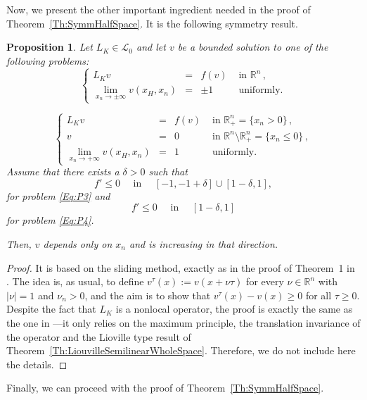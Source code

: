 \documentclass[12pt,reqno]{amsart}
\makeatletter
\newtheorem{proposition}[theorem]{Proposition}
\theoremstyle{definition}
\theoremstyle{remark}
\newcommand{\con}[1]{\mathbb{#1}}
\newcommand{\R}{\con{R}} %
\newcommand{\lcal}{\mathcal{L}}
\newcommand{\reqnomode}{\tagsleft@false\let\veqno\@@eqno}
\newcommand\beqc[1]{\left\{\begin{array}{#1}}
\newcommand\eeqc{\end{array} \right.}
\def\PDEsystem{rcll}
\def\ds{\displaystyle}
\numberwithin{equation}{section}
\makeatother
\begin{document}
Now, we present the other important ingredient needed in the proof of Theorem~\ref{Th:SymmHalfSpace}. It is the following symmetry result.

\begin{proposition}
	\label{Prop:HalfSpaceLimUnif}
	Let $L_K \in \lcal_0$ and let $v$ be a bounded solution to one of the following problems:
	\begin{equation}
	\tag{P3}
	\label{Eq:P3}
	\beqc{\PDEsystem}
	L_K  v &=& f(v)  &\textrm{ in }\R^n\,,\\
	\ds \lim_{x_n \to \pm \infty} v(x_H,x_n) &=& \pm 1 \,\,\, &\textrm{ uniformly}.
	\eeqc
	\end{equation}
	
	\begin{equation}
	\tag{P4}
	\label{Eq:P4}
	\beqc{\PDEsystem}
	L_K  v &=& f(v)  &\textrm{ in }\R^n_+ = \{ x_n>0\} \,,\\
	v &=& 0  &\textrm{ in } \R^n \setminus \R^n_+ = \{ x_n\leq 0\}\,,\\
	\ds \lim_{x_n \to + \infty} v(x_H,x_n) &=& 1 \,\,\, &\textrm{ uniformly}.
	\eeqc
	\end{equation}
	\reqnomode
	Assume that there exists a $\delta > 0$ such that
	$$ f' \leq 0 \quad \text{ in } \quad [-1,-1+\delta]\cup[1-\delta,1], $$
	for problem \eqref{Eq:P3} and
	$$ f' \leq 0 \quad \text{ in } \quad [1-\delta,1] $$
	for problem \eqref{Eq:P4}.
	
	Then, $v$ depends only on $x_n$ and is increasing in that direction.
\end{proposition}

\begin{proof}
	It is based on the sliding method, exactly as in the proof of Theorem~1 in \cite{BerestyckiHamelMonneau}. The idea is, as usual,   to define $ v^\tau(x) := v(x+\nu \tau) $ for every $\nu\in\R^n$ with $|\nu|=1$ and $\nu_n>0$, and the aim is to show that $v^\tau(x)-v(x)\geq 0$ for all $\tau\geq 0$. Despite the fact that $L_K$ is a nonlocal operator, the proof is exactly the same as the one in \cite{BerestyckiHamelMonneau} ---it only relies on the maximum principle, the translation invariance of the operator and the Lioville type result of Theorem~\ref{Th:LiouvilleSemilinearWholeSpace}. Therefore, we do not include here the details.
\end{proof}






Finally, we can proceed with the proof of Theorem~\ref{Th:SymmHalfSpace}.
\end{document}
